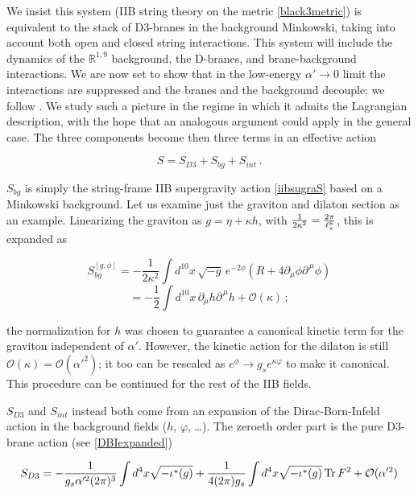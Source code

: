 We insist this system (IIB string theory on the metric \ref{black3metric}) is equivalent to the stack of D3-branes in the background Minkowski, taking into account both open and closed string interactions. This system will include the dynamics of the $\mathbb{R}^{1,9}$ background, the D-branes, and brane-background interactions. We are now set to show that in the low-energy $\alpha' \rightarrow 0$ limit the interactions are suppressed and the branes and the background decouple; we follow \cite{erdmenger}. We study such a picture in the regime in which it admits the Lagrangian description, with the hope that an analogous argument could apply in the general case. The three components become then three terms in an effective action

\begin{equation}
	S = S_{D3} + S_{bg} + S_{int}\,.
	\label{}
\end{equation}

$S_{bg}$ is simply the string-frame IIB supergravity action \eqref{iibsugraS} based on a Minkowski background. Let us examine just the graviton and dilaton section as an example. Linearizing the graviton as $g = \eta + \kappa h$, with $\frac{1}{2\kappa^2} = \frac{2\pi}{\ell_s^8}$, this is expanded as

\begin{equation}
	S_{bg}^{[g,\phi]} = - \frac{1}{2\kappa^2} \int d^{10}x \, \sqrt{-g} \, e^{-2\phi} (R + 4 \partial_\mu \phi \partial^{\,\mu} \phi) 
\end{equation}
\begin{equation}
	= - \frac{1}{2} \int d^{10} x \, \partial_\mu h \partial^{\,\mu} h + \mathcal{O}(\kappa)\,;
	\label{}
\end{equation}

the normalization for $h$ was chosen to guarantee a canonical kinetic term for the graviton independent of $\alpha'$. However, the kinetic action for the dilaton is still $\mathcal{O}(\kappa) = \mathcal{O}(\alpha'^2)$; it too can be rescaled as $e^\phi \rightarrow g_s e^{\kappa \varphi}$ to make it canonical. This procedure can be continued for the rest of the IIB fields.

$S_{D3}$ and $S_{int}$ instead both come from an expansion of the Dirac-Born-Infeld action in the background fields ($h$, $\varphi$, \ldots). The zeroeth order part is the pure D3-brane action (see \eqref{DBIexpanded})

\begin{equation}
	S_{D3} = - \frac{1}{g_s \alpha'^2 (2\pi)^3} \int d^4 x \sqrt{-\iota^*(g)} + \frac{1}{4(2\pi)g_s} \int d^4 x \sqrt{-\iota^*(g)} \operatorname{Tr} F^2 + \mathcal{O}(\alpha'^2)
	\label{}
\end{equation}

